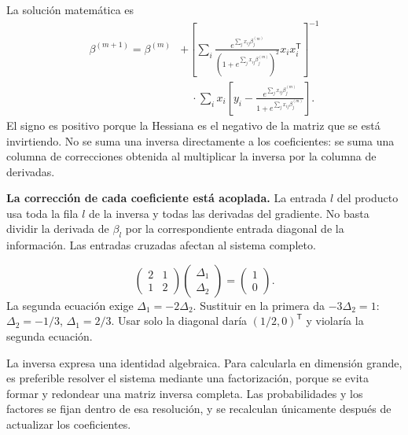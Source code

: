\documentclass[11pt,a4paper]{article}
\newcommand{\T}{^{\mathsf T}}
\begin{document}
La solución matemática es
\[
\boxed{
\begin{aligned}
\beta^{(m+1)}=\beta^{(m)}
&+\left[\sum_i
\frac{e^{\sum_jx_{ij}\beta_j^{(m)}}}
{(1+e^{\sum_jx_{ij}\beta_j^{(m)}})^2}x_ix_i\T\right]^{-1}\\
&\quad\cdot\sum_i x_i\left[
y_i-\frac{e^{\sum_jx_{ij}\beta_j^{(m)}}}
{1+e^{\sum_jx_{ij}\beta_j^{(m)}}}\right].
\end{aligned}}
\]
El signo es positivo porque la Hessiana es el negativo de la
matriz que se está invirtiendo.
No se suma una inversa directamente a los coeficientes:
se suma una columna de correcciones obtenida al multiplicar
la inversa por la columna de derivadas.

\textbf{La corrección de cada coeficiente está acoplada.}
La entrada $l$ del producto usa toda la fila $l$ de la inversa
y todas las derivadas del gradiente.
No basta dividir la derivada de $\beta_l$ por la correspondiente
entrada diagonal de la información. Las entradas cruzadas
afectan al sistema completo.

\begin{ejemplo}
\[
\begin{pmatrix}2&1\\1&2\end{pmatrix}
\begin{pmatrix}\Delta_1\\\Delta_2\end{pmatrix}
=\begin{pmatrix}1\\0\end{pmatrix}.
\]
La segunda ecuación exige $\Delta_1=-2\Delta_2$.
Sustituir en la primera da $-3\Delta_2=1$:
$\Delta_2=-1/3$, $\Delta_1=2/3$.
Usar solo la diagonal daría $(1/2,0)\T$ y violaría la segunda ecuación.
\end{ejemplo}
La inversa expresa una identidad algebraica.
Para calcularla en dimensión grande, es preferible resolver el
sistema mediante una factorización, porque se evita formar y
redondear una matriz inversa completa.
Las probabilidades y los factores se fijan dentro de esa resolución,
y se recalculan únicamente después de actualizar los coeficientes.

\clearpage
\end{document}
